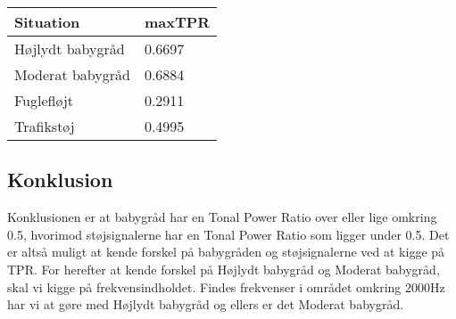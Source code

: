 \begin{center}
    \begin{tabular}{ | l | l |}
    \hline
    \textbf{Situation} & \textbf{maxTPR}  \\ \hline
    Højlydt babygråd & 0.6697   \\ \hline
    Moderat babygråd & 0.6884  \\ \hline
    Fuglefløjt & 0.2911  \\ \hline
    Trafikstøj & 0.4995  \\
    \hline
    \end{tabular}
\end{center}

\subsection{Konklusion}
Konklusionen er at babygråd har en Tonal Power Ratio over eller lige omkring 0.5, hvorimod støjsignalerne har en Tonal Power Ratio som ligger under 0.5. Det er altså muligt at kende forskel på babygråden og støjsignalerne ved at kigge på TPR. For herefter at kende forskel på Højlydt babygråd og Moderat babygråd, skal vi kigge på frekvensindholdet. Findes frekvenser i området omkring 2000Hz har vi at gøre med Højlydt babygråd og ellers er det Moderat babygråd. 